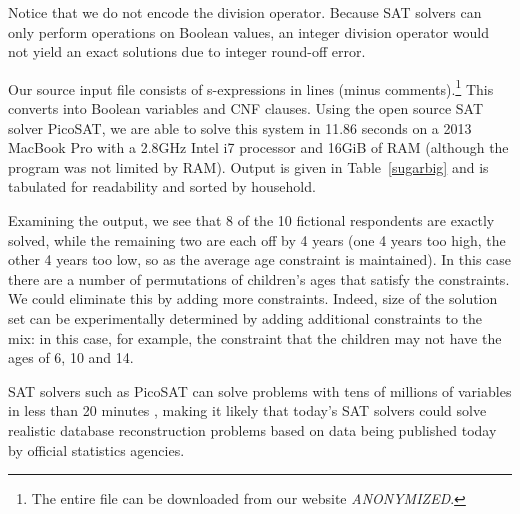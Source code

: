 \documentclass[runningheads]{llncs}
\begin{document}
Notice that we do not encode the division operator. Because SAT
solvers can only perform operations on Boolean values, an integer division
operator would not yield an exact solutions due to integer round-off error.

Our source input file consists of \NumSExpressions s-expressions in \NumConstraintLines{} lines (minus comments).\footnote{The entire file can be downloaded from our website \emph{ANONYMIZED}.}
This converts into
\NumVariables Boolean variables and \NumClauses CNF clauses. Using the
open source SAT solver PicoSAT\cite{Biere_picosatessentials}, we are able
to solve this system in 11.86 seconds on a 2013 MacBook Pro with a 2.8GHz Intel
i7 processor and 16GiB of RAM (although the program was not limited by RAM). Output is given in Table~\ref{sugarbig} and is tabulated for readability and sorted by household.

Examining the output, we see that 8 of the 10 fictional respondents are exactly solved, while the remaining two are each off by 4 years (one 4 years too high, the other 4 years too low, so as the average age constraint is maintained). In this case there are a number of permutations of children's ages that satisfy the constraints. We could eliminate this by adding more constraints. Indeed, size of the solution set can be experimentally determined by adding additional constraints to the mix: in this case, for example, the constraint that the children may not have the ages of 6, 10 and 14. 

SAT solvers such as PicoSAT can solve problems
with tens of millions of variables in less than 20 minutes
\cite{satcomp}, making it likely that today's SAT solvers could solve
realistic database reconstruction problems based on data being
published today by official statistics agencies.
\end{document}
